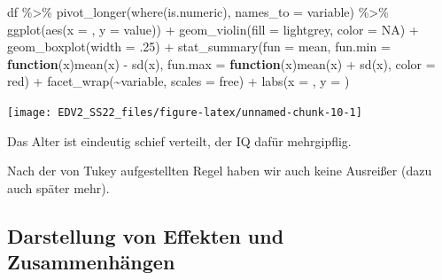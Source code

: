 \documentclass[
]{book}
\newenvironment{Shaded}{\begin{snugshade}}{\end{snugshade}}
\newcommand{\AttributeTok}[1]{\textcolor[rgb]{0.77,0.63,0.00}{#1}}
\newcommand{\ConstantTok}[1]{\textcolor[rgb]{0.00,0.00,0.00}{#1}}
\newcommand{\ControlFlowTok}[1]{\textcolor[rgb]{0.13,0.29,0.53}{\textbf{#1}}}
\newcommand{\DecValTok}[1]{\textcolor[rgb]{0.00,0.00,0.81}{#1}}
\newcommand{\FunctionTok}[1]{\textcolor[rgb]{0.00,0.00,0.00}{#1}}
\newcommand{\NormalTok}[1]{#1}
\newcommand{\SpecialCharTok}[1]{\textcolor[rgb]{0.00,0.00,0.00}{#1}}
\newcommand{\StringTok}[1]{\textcolor[rgb]{0.31,0.60,0.02}{#1}}
\begin{document}
\begin{Shaded}
\begin{Highlighting}[]
\NormalTok{df }\SpecialCharTok{\%\textgreater{}\%} 
  \FunctionTok{pivot\_longer}\NormalTok{(}\FunctionTok{where}\NormalTok{(is.numeric),}
               \AttributeTok{names\_to =} \StringTok{\textquotesingle{}variable\textquotesingle{}}\NormalTok{) }\SpecialCharTok{\%\textgreater{}\%}  
  \FunctionTok{ggplot}\NormalTok{(}\FunctionTok{aes}\NormalTok{(}\AttributeTok{x =} \StringTok{\textquotesingle{}\textquotesingle{}}\NormalTok{, }\AttributeTok{y =}\NormalTok{ value)) }\SpecialCharTok{+}
  \FunctionTok{geom\_violin}\NormalTok{(}\AttributeTok{fill =} \StringTok{\textquotesingle{}lightgrey\textquotesingle{}}\NormalTok{, }\AttributeTok{color =} \ConstantTok{NA}\NormalTok{) }\SpecialCharTok{+}
  \FunctionTok{geom\_boxplot}\NormalTok{(}\AttributeTok{width =}\NormalTok{ .}\DecValTok{25}\NormalTok{) }\SpecialCharTok{+}
  \FunctionTok{stat\_summary}\NormalTok{(}\AttributeTok{fun =}\NormalTok{ mean, }
               \AttributeTok{fun.min =} \ControlFlowTok{function}\NormalTok{(x)}\FunctionTok{mean}\NormalTok{(x) }\SpecialCharTok{{-}} \FunctionTok{sd}\NormalTok{(x), }
               \AttributeTok{fun.max =} \ControlFlowTok{function}\NormalTok{(x)}\FunctionTok{mean}\NormalTok{(x) }\SpecialCharTok{+} \FunctionTok{sd}\NormalTok{(x),}
               \AttributeTok{color =} \StringTok{\textquotesingle{}red\textquotesingle{}}\NormalTok{) }\SpecialCharTok{+}
  \FunctionTok{facet\_wrap}\NormalTok{(}\SpecialCharTok{\textasciitilde{}}\NormalTok{variable, }\AttributeTok{scales =} \StringTok{\textquotesingle{}free\textquotesingle{}}\NormalTok{) }\SpecialCharTok{+}
  \FunctionTok{labs}\NormalTok{(}\AttributeTok{x =} \StringTok{\textquotesingle{}\textquotesingle{}}\NormalTok{,}
       \AttributeTok{y =} \StringTok{\textquotesingle{}\textquotesingle{}}\NormalTok{)}
\end{Highlighting}
\end{Shaded}

\begin{center}\texttt{[image: EDV2\_SS22\_files/figure-latex/unnamed-chunk-10-1]} \end{center}

Das Alter ist eindeutig schief verteilt, der IQ dafür mehrgipflig.

Nach der von Tukey aufgestellten Regel \citep{tukeyExploratoryDataAnalysis1977} haben wir auch keine Ausreißer (dazu auch später mehr).

\hypertarget{darstellung-von-effekten-und-zusammenhuxe4ngen}{%
\subsection{Darstellung von Effekten und Zusammenhängen}\label{darstellung-von-effekten-und-zusammenhuxe4ngen}}
\end{document}
